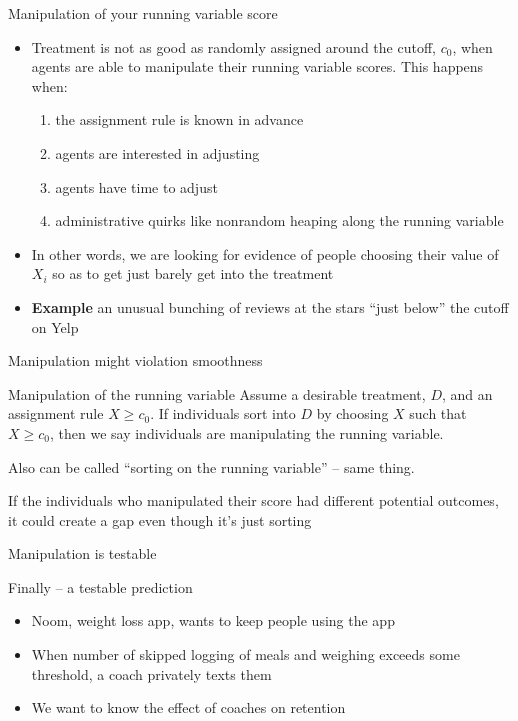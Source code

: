 \documentclass{beamer}
\begin{document}
\begin{frame}{Manipulation of your running variable score}
	
	\begin{itemize}
	\item Treatment is not as good as randomly assigned around the cutoff, $c_0$, when agents are able to manipulate their running variable scores.  This happens when:
		\begin{enumerate}
		\item the assignment rule is known in advance
		\item agents are interested in adjusting
		\item agents have time to adjust
		\item administrative quirks like nonrandom heaping along the running variable
		\end{enumerate}
	\item In other words, we are looking for evidence of people choosing their value of $X_i$ so as to get just barely get into the treatment
	\item \textbf{Example} an unusual bunching of reviews at the stars ``just below'' the cutoff on Yelp
	\end{itemize}
\end{frame}



\begin{frame}{Manipulation might violation smoothness}
	
	\begin{block}{Manipulation of the running variable}
Assume a desirable treatment, $D$, and an assignment rule $X\geq{c_0}$.  If individuals sort into $D$ by choosing $X$ such that $X\geq{c_0}$, then we say individuals are manipulating the running variable. 
	\end{block}
Also can be called ``sorting on the running variable'' -- same thing.

\bigskip

If the individuals who manipulated their score had different potential outcomes, it could create a gap even though it's just sorting

\end{frame}

\begin{frame}{Manipulation is testable}

Finally -- a testable prediction

\bigskip

	\begin{itemize}
		\item Noom, weight loss app, wants to keep people using the app
		\item When number of skipped logging of meals and weighing exceeds some threshold, a coach privately texts them
		\item We want to know the effect of coaches on retention
	\end{itemize}
			
\end{frame}
\end{document}

